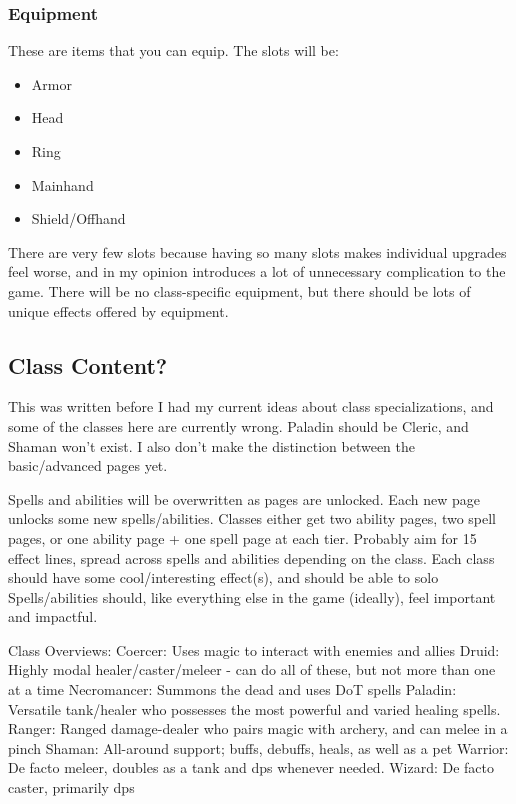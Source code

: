 \documentclass{article}
\begin{document}
\subsubsection{Equipment}
These are items that you can equip. The slots will be:
\begin{itemize}
    \item Armor
    \item Head
    \item Ring
    \item Mainhand
    \item Shield/Offhand
\end{itemize}
There are very few slots because having so many slots makes individual upgrades feel worse, and in
my opinion introduces a lot of unnecessary complication to the game. There will be no class-specific
equipment, but there should be lots of unique effects offered by equipment.


\subsection{Class Content?}
This was written before I had my current ideas about class specializations, and some of the classes
here are currently wrong. Paladin should be Cleric, and Shaman won't exist. I also don't make
the distinction between the basic/advanced pages yet.

Spells and abilities will be overwritten as pages are unlocked.
Each new page unlocks some new spells/abilities.
Classes either get two ability pages, two spell pages, or one ability page + one spell page at each tier.
Probably aim for 15 effect lines, spread across spells and abilities depending on the class.
Each class should have some cool/interesting effect(s), and should be able to solo
Spells/abilities should, like everything else in the game (ideally), feel important and impactful.

Class Overviews:
Coercer: Uses magic to interact with enemies and allies
Druid: Highly modal healer/caster/meleer - can do all of these, but not more than one at a time
Necromancer: Summons the dead and uses DoT spells
Paladin: Versatile tank/healer who possesses the most powerful and varied healing spells.
Ranger: Ranged damage-dealer who pairs magic with archery, and can melee in a pinch
Shaman: All-around support; buffs, debuffs, heals, as well as a pet
Warrior: De facto meleer, doubles as a tank and dps whenever needed.
Wizard: De facto caster, primarily dps
\end{document}
